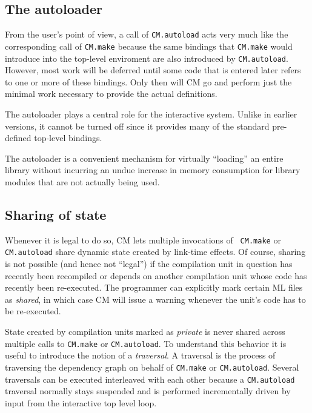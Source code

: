 \documentclass[titlepage,letterpaper]{article}
\begin{document}
\subsection{The autoloader}
\label{sec:autoload}

From the user's point of view, a call of {\tt CM.autoload} acts very
much like the corresponding call of {\tt CM.make} because the same
bindings that {\tt CM.make} would introduce into the top-level
enviroment are also introduced by {\tt CM.autoload}.  However, most
work will be deferred until some code that is entered later refers to
one or more of these bindings.  Only then will CM go and perform just
the minimal work necessary to provide the actual definitions.

The autoloader plays a central role for the interactive system.
Unlike in earlier versions, it cannot be turned off since it provides
many of the standard pre-defined top-level bindings.

The autoloader is a convenient mechanism for virtually ``loading'' an
entire library without incurring an undue increase in memory
consumption for library modules that are not actually being used.

\subsection{Sharing of state}
\label{sec:sharing}

Whenever it is legal to do so, CM lets multiple invocations of {\tt
CM.make} or {\tt CM.autoload} share dynamic state created by link-time
effects.  Of course, sharing is not possible (and hence not ``legal'')
if the compilation unit in question has recently been recompiled or
depends on another compilation unit whose code has recently been
re-executed.  The programmer can explicitly mark certain ML files as
{\em shared}, in which case CM will issue a warning whenever the
unit's code has to be re-executed.

State created by compilation units marked as {\em private} is never
shared across multiple calls to {\tt CM.make} or {\tt CM.autoload}.
To understand this behavior it is useful to introduce the notion of a
{\em traversal}.  A traversal is the process of traversing the
dependency graph on behalf of {\tt CM.make} or {\tt CM.autoload}.
Several traversals can be executed interleaved with each other because
a {\tt CM.autoload} traversal normally stays suspended and is
performed incrementally driven by input from the interactive top level
loop.
\end{document}
